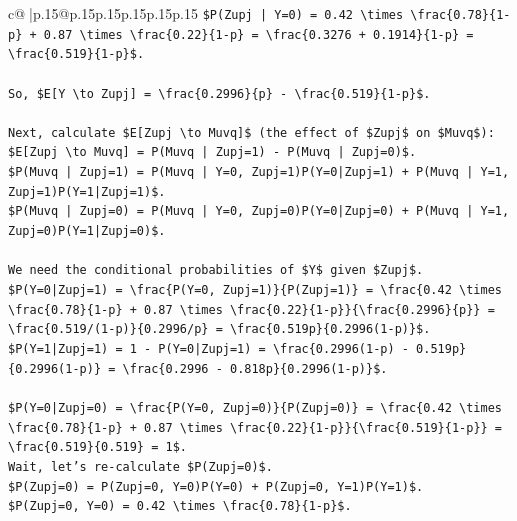 \documentclass{article}
\begin{document}
{\begin{supertabular}{c@{$\;$}|p{.15\linewidth}@{}p{.15\linewidth}p{.15\linewidth}p{.15\linewidth}p{.15\linewidth}p{.15\linewidth}}
{{{\texttt{\$P(Zupj | Y=0) = 0.42 \textbackslash{}times \textbackslash{}frac\{0.78\}\{1{-}p\} + 0.87 \textbackslash{}times \textbackslash{}frac\{0.22\}\{1{-}p\} = \textbackslash{}frac\{0.3276 + 0.1914\}\{1{-}p\} = \textbackslash{}frac\{0.519\}\{1{-}p\}\$.} \\
\\ 
\texttt{So, \$E{[}Y \textbackslash{}to Zupj{]} = \textbackslash{}frac\{0.2996\}\{p\} {-} \textbackslash{}frac\{0.519\}\{1{-}p\}\$.} \\
\\ 
\texttt{Next, calculate \$E{[}Zupj \textbackslash{}to Muvq{]}\$ (the effect of \$Zupj\$ on \$Muvq\$):} \\
\texttt{\$E{[}Zupj \textbackslash{}to Muvq{]} = P(Muvq | Zupj=1) {-} P(Muvq | Zupj=0)\$.} \\
\texttt{\$P(Muvq | Zupj=1) = P(Muvq | Y=0, Zupj=1)P(Y=0|Zupj=1) + P(Muvq | Y=1, Zupj=1)P(Y=1|Zupj=1)\$.} \\
\texttt{\$P(Muvq | Zupj=0) = P(Muvq | Y=0, Zupj=0)P(Y=0|Zupj=0) + P(Muvq | Y=1, Zupj=0)P(Y=1|Zupj=0)\$.} \\
\\ 
\texttt{We need the conditional probabilities of \$Y\$ given \$Zupj\$.} \\
\texttt{\$P(Y=0|Zupj=1) = \textbackslash{}frac\{P(Y=0, Zupj=1)\}\{P(Zupj=1)\} = \textbackslash{}frac\{0.42 \textbackslash{}times \textbackslash{}frac\{0.78\}\{1{-}p\} + 0.87 \textbackslash{}times \textbackslash{}frac\{0.22\}\{1{-}p\}\}\{\textbackslash{}frac\{0.2996\}\{p\}\} = \textbackslash{}frac\{0.519/(1{-}p)\}\{0.2996/p\} = \textbackslash{}frac\{0.519p\}\{0.2996(1{-}p)\}\$.} \\
\texttt{\$P(Y=1|Zupj=1) = 1 {-} P(Y=0|Zupj=1) = \textbackslash{}frac\{0.2996(1{-}p) {-} 0.519p\}\{0.2996(1{-}p)\} = \textbackslash{}frac\{0.2996 {-} 0.818p\}\{0.2996(1{-}p)\}\$.} \\
\\ 
\texttt{\$P(Y=0|Zupj=0) = \textbackslash{}frac\{P(Y=0, Zupj=0)\}\{P(Zupj=0)\} = \textbackslash{}frac\{0.42 \textbackslash{}times \textbackslash{}frac\{0.78\}\{1{-}p\} + 0.87 \textbackslash{}times \textbackslash{}frac\{0.22\}\{1{-}p\}\}\{\textbackslash{}frac\{0.519\}\{1{-}p\}\} = \textbackslash{}frac\{0.519\}\{0.519\} = 1\$.} \\
\texttt{Wait, let's re{-}calculate \$P(Zupj=0)\$.} \\
\texttt{\$P(Zupj=0) = P(Zupj=0, Y=0)P(Y=0) + P(Zupj=0, Y=1)P(Y=1)\$.} \\
\texttt{\$P(Zupj=0, Y=0) = 0.42 \textbackslash{}times \textbackslash{}frac\{0.78\}\{1{-}p\}\$.} \\
}}}
\end{supertabular}}
\end{document}

